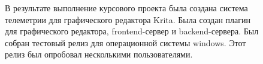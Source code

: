 \Conclusion %

\begin{figure}
В результате выполнение курсового проекта была создана система телеметрии для графического редактора Krita. Была создан плагин для графического редактора, frontend-сервер и backend-сервера. Был собран тестовый релиз для операционной системы windows. Этот релиз был опробовал несколькими пользователями.
\end{figure}
